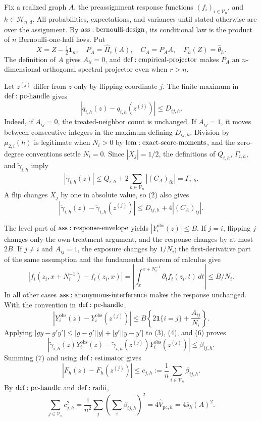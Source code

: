 Fix a realized graph \(A\), the preassignment response functions \((f_i)_{i\in\mathcal V_n}\), and \(h\in\mathcal H_{n,d}\).  All probabilities, expectations, and variances until stated otherwise are over the assignment.  By \({\rm ass:bernoulli\text{-}design}\), its conditional law is the product of \(n\) Bernoulli-one-half laws.  Put
\[
 X=Z-\tfrac12\mathbf1_n,\quad
 P_A=\widehat\Pi_r(A),\quad C_A=P_AA,
 \quad F_h(Z)=\widehat\theta_h.
\tag{1}
\]
The definition of \(A\) gives \(A_{ii}=0\), and \({\rm def:empirical\text{-}projector}\) makes \(P_A\) an \(n\)-dimensional orthogonal spectral projector even when \(r>n\).

Let \(z^{(j)}\) differ from \(z\) only by flipping coordinate \(j\).  The finite maximum in \({\rm def:pc\text{-}handle}\) gives
\[
 |q_{i,h}(z)-q_{i,h}(z^{(j)})|\leq D_{ij,h}.
\tag{2}
\]
Indeed, if \(A_{ij}=0\), the treated-neighbor count is unchanged.  If \(A_{ij}=1\), it moves between consecutive integers in the maximum defining \(D_{ij,h}\).  Division by \(\mu_{2,i}(h)\) is legitimate when \(N_i>0\) by \({\rm lem:exact\text{-}score\text{-}moments}\), and the zero-degree conventions settle \(N_i=0\).  Since \(|X_j|=1/2\), the definitions of \(Q_{i,h}\), \(\Gamma_{i,h}\), and \(\widetilde\gamma_{i,h}\) imply
\[
 |\widetilde\gamma_{i,h}(z)|
 \leq Q_{i,h}+2\sum_{k\in\mathcal V_n}|(C_A)_{ik}|
 =\Gamma_{i,h}.
\tag{3}
\]
A flip changes \(X_j\) by one in absolute value, so (2) also gives
\[
 |\widetilde\gamma_{i,h}(z)-\widetilde\gamma_{i,h}(z^{(j)})|
 \leq D_{ij,h}+4|(C_A)_{ij}|.
\tag{4}
\]

The level part of \({\rm ass:response\text{-}envelope}\) yields \(|Y_i^{\mathrm{obs}}(z)|\leq B\).  If \(j=i\), flipping \(j\) changes only the own-treatment argument, and the response changes by at most \(2B\).  If \(j\ne i\) and \(A_{ij}=1\), the exposure changes by \(1/N_i\); the first-derivative part of the same assumption and the fundamental theorem of calculus give
\[
 |f_i(z_i,x+N_i^{-1})-f_i(z_i,x)|
 =\left|\int_x^{x+N_i^{-1}}\partial_t f_i(z_i,t)\,dt\right|
 \leq B/N_i.
\tag{5}
\]
In all other cases \({\rm ass:anonymous\text{-}interference}\) makes the response unchanged.  With the convention in \({\rm def:pc\text{-}handle}\),
\[
 |Y_i^{\mathrm{obs}}(z)-Y_i^{\mathrm{obs}}(z^{(j)})|
 \leq B\left\{2\mathbf1\{i=j\}+\frac{A_{ij}}{N_i}\right\}.
\tag{6}
\]
Applying \(|gy-g'y'|\leq|g-g'||y|+|g'||y-y'|\) to (3), (4), and (6) proves
\[
 |\widetilde\gamma_{i,h}(z)Y_i^{\mathrm{obs}}(z)
 -\widetilde\gamma_{i,h}(z^{(j)})Y_i^{\mathrm{obs}}(z^{(j)})|
 \leq\beta_{ij,h}.
\tag{7}
\]
Summing (7) and using \({\rm def:estimator}\) gives
\[
 |F_h(z)-F_h(z^{(j)})|
 \leq c_{j,h}:=\frac1n\sum_{i\in\mathcal V_n}\beta_{ij,h}.
\tag{8}
\]
By \({\rm def:pc\text{-}handle}\) and \({\rm def:radii}\),
\[
 \sum_{j\in\mathcal V_n}c_{j,h}^2
 =\frac1{n^2}\sum_j\left(\sum_i\beta_{ij,h}\right)^2
 =4\widehat V_{\mathrm{pc},h}=4\overline s_h(A)^2.
\tag{9}
\]

